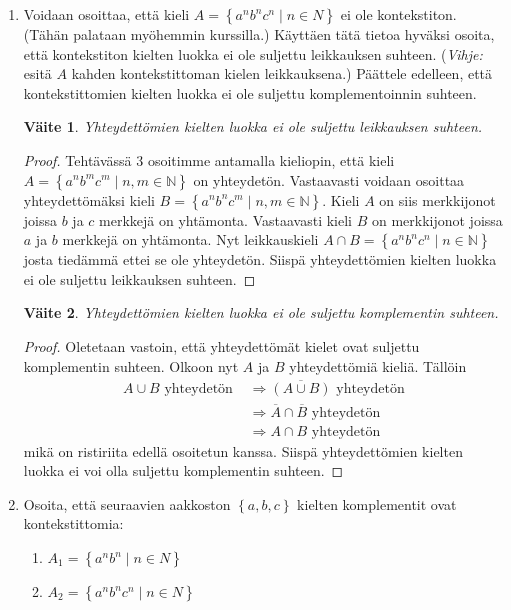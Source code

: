 \documentclass[a4paper,11pt]{article}
\newtheorem*{claim}{Väite}
\newcommand{\set}[1]{{\left\{ #1 \right\}}}
\newcommand{\Nat}{\mathbb{N}}
\begin{document}
\begin{enumerate}
\item
  Voidaan osoittaa, että kieli $A=\set{ a^n b^n c^n\mid n\in N}$ ei
  ole kontekstiton. (Tähän palataan myöhemmin kurssilla.) Käyttäen
  tätä tietoa hyväksi osoita, että kontekstiton kielten luokka ei ole
  suljettu leikkauksen suhteen. ({\em Vihje:} esitä $A$ kahden
  kontekstittoman kielen leikkauksena.) Päättele edelleen, että
  kontekstittomien kielten luokka ei ole suljettu komplementoinnin
  suhteen.
  \begin{claim}
    Yhteydettömien kielten luokka ei ole suljettu leikkauksen suhteen.
  \end{claim}
  \begin{proof}
    Tehtävässä 3 osoitimme antamalla kieliopin, että kieli $A =
    \set{a^nb^mc^m \mid n,m \in \Nat}$ on yhteydetön. Vastaavasti
    voidaan osoittaa yhteydettömäksi kieli $B = \set{a^nb^nc^m \mid
      n,m \in \Nat}$. Kieli $A$ on siis merkkijonot joissa $b$ ja $c$
    merkkejä on yhtämonta. Vastaavasti kieli $B$ on merkkijonot joissa
    $a$ ja $b$ merkkejä on yhtämonta. Nyt leikkauskieli $A \cap B =
    \set{a^nb^nc^n \mid n \in \Nat}$ josta tiedämmä ettei se ole
    yhteydetön. Siispä yhteydettömien kielten luokka ei ole suljettu
    leikkauksen suhteen.
  \end{proof}
  \begin{claim}
    Yhteydettömien kielten luokka ei ole suljettu komplementin suhteen.
  \end{claim}
  \begin{proof}
    Oletetaan vastoin, että yhteydettömät kielet ovat suljettu
    komplementin suhteen. Olkoon nyt $A$ ja $B$ yhteydettömiä kieliä.
    Tällöin
    \begin{align*}
      A \cup B \text{ yhteydetön }
      & \Rightarrow \overline{(A \cup B)} \text{ yhteydetön} \\
      & \Rightarrow \overline{A} \cap \overline{B} \text{ yhteydetön} \\
      & \Rightarrow A \cap B \text{ yhteydetön}
    \end{align*}
    mikä on ristiriita edellä osoitetun kanssa. Siispä yhteydettömien
    kielten luokka ei voi olla suljettu komplementin suhteen.
  \end{proof}

\item
  Osoita, että seuraavien aakkoston $\set{a,b,c}$ kielten komplementit ovat kontekstittomia:
  \begin{enumerate}
  \item $A_1=\set{ a^n b^n \mid n \in N}$
  \item $A_2=\set{ a^n b^n c^n\mid n \in N}$
  \end{enumerate}


\end{enumerate}
\end{document}
